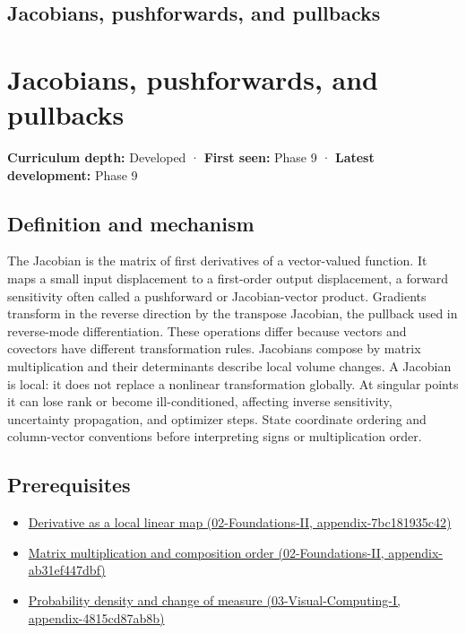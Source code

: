 \hypertarget{appendix-d8a7ddb675eb}{}
\section*{Jacobians, pushforwards, and pullbacks}
\chapter{Jacobians, pushforwards, and pullbacks}\label{appendix-d8a7ddb675eb-jacobians-pushforwards-and-pullbacks}

\textbf{Curriculum depth:} Developed · \textbf{First seen:} Phase 9 · \textbf{Latest development:} Phase 9

\section{Definition and mechanism}\label{appendix-d8a7ddb675eb-definition-and-mechanism}

The Jacobian is the matrix of first derivatives of a vector-valued function. It maps a small input displacement to a first-order output displacement, a forward sensitivity often called a pushforward or Jacobian-vector product. Gradients transform in the reverse direction by the transpose Jacobian, the pullback used in reverse-mode differentiation. These operations differ because vectors and covectors have different transformation rules. Jacobians compose by matrix multiplication and their determinants describe local volume changes. A Jacobian is local: it does not replace a nonlinear transformation globally. At singular points it can lose rank or become ill-conditioned, affecting inverse sensitivity, uncertainty propagation, and optimizer steps. State coordinate ordering and column-vector conventions before interpreting signs or multiplication order.

\section{Prerequisites}\label{appendix-d8a7ddb675eb-prerequisites}

\begin{itemize}
\tightlist
\item
  \href{../02-Foundations-II/main.pdf\#nameddest=appendix-7bc181935c42}{Derivative as a local linear map (02-Foundations-II, appendix-7bc181935c42)}
\item
  \href{../02-Foundations-II/main.pdf\#nameddest=appendix-ab31ef447dbf}{Matrix multiplication and composition order (02-Foundations-II, appendix-ab31ef447dbf)}
\item
  \href{../03-Visual-Computing-I/main.pdf\#nameddest=appendix-4815cd87ab8b}{Probability density and change of measure (03-Visual-Computing-I, appendix-4815cd87ab8b)}
\end{itemize}

